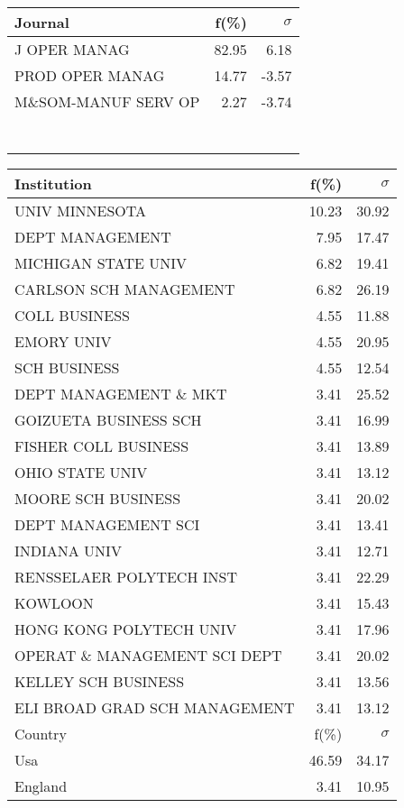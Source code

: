 \documentclass[a4paper,11pt]{report}
\begin{document}
\begin{landscape}
\begin{table}[!ht]
{\begin{tabular}{|l r  r|}
\hline
\hline
Journal & f(\%) & $\sigma$\\
\hline
J OPER MANAG & 82.95 & 6.18\\
PROD OPER MANAG & 14.77 & -3.57\\
M\&SOM-MANUF SERV OP & 2.27 & -3.74\\
 &  & \\
 &  & \\
 &  & \\
 &  & \\
 &  & \\
 &  & \\
 &  & \\
\hline
\end{tabular}
}
{\scriptsize\begin{tabular}{|l r r|}
\hline
Institution & f(\%) & $\sigma$\\
\hline
UNIV MINNESOTA & 10.23 & 30.92\\
DEPT MANAGEMENT & 7.95 & 17.47\\
MICHIGAN STATE UNIV & 6.82 & 19.41\\
CARLSON SCH MANAGEMENT & 6.82 & 26.19\\
COLL BUSINESS & 4.55 & 11.88\\
EMORY UNIV & 4.55 & 20.95\\
SCH BUSINESS & 4.55 & 12.54\\
DEPT MANAGEMENT \& MKT & 3.41 & 25.52\\
GOIZUETA BUSINESS SCH & 3.41 & 16.99\\
FISHER COLL BUSINESS & 3.41 & 13.89\\
OHIO STATE UNIV & 3.41 & 13.12\\
MOORE SCH BUSINESS & 3.41 & 20.02\\
DEPT MANAGEMENT SCI & 3.41 & 13.41\\
INDIANA UNIV & 3.41 & 12.71\\
RENSSELAER POLYTECH INST & 3.41 & 22.29\\
KOWLOON & 3.41 & 15.43\\
HONG KONG POLYTECH UNIV & 3.41 & 17.96\\
OPERAT \& MANAGEMENT SCI DEPT & 3.41 & 20.02\\
KELLEY SCH BUSINESS & 3.41 & 13.56\\
ELI BROAD GRAD SCH MANAGEMENT & 3.41 & 13.12\\
\hline
\hline
Country & f(\%) & $\sigma$\\
\hline
Usa & 46.59 & 34.17\\
England & 3.41 & 10.95\\

\end{tabular}}
\end{table}
\end{landscape}
\end{document}
